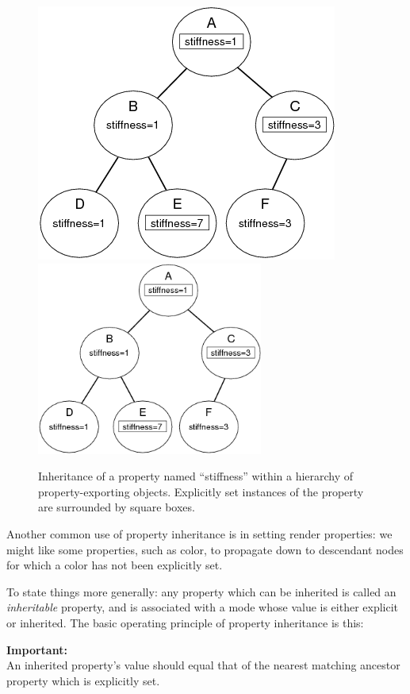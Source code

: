 \begin{figure}
\begin{center}
\iflatexml
\includegraphics[]{images/inheritance}
\else
\includegraphics[height=2.5in]{images/inheritance}
\fi
\end{center}
\caption{Inheritance of a property named ``stiffness'' within a
hierarchy of property-exporting objects. Explicitly set instances of
the property are surrounded by square boxes.}%
\label{inheritFig}
\end{figure}

Another common use of property inheritance is in setting render
properties: we might like some properties, such as color, to propagate
down to descendant nodes for which a color has not been explicitly
set.

To state things more generally: any property which can be inherited is
called an {\it inheritable} property, and is associated with a mode
whose value is either explicit or inherited. The basic operating
principle of property inheritance is this:

\begin{sideblock}
{\bf Important:}\\
An inherited property's value should equal that
of the nearest matching ancestor property which is explicitly set.
\end{sideblock}

